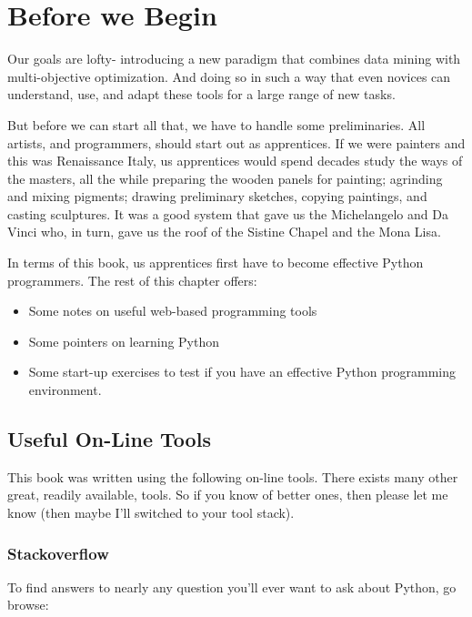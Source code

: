 \section{Before we Begin}\label{before-we-begin}

Our goals are lofty- introducing a new paradigm that combines data
mining with multi-objective optimization. And doing so in such a way
that even novices can understand, use, and adapt these tools for a large
range of new tasks.

But before we can start all that, we have to handle some preliminaries.
All artists, and programmers, should start out as apprentices. If we
were painters and this was Renaissance Italy, us apprentices would spend
decades study the ways of the masters, all the while preparing the
wooden panels for painting; agrinding and mixing pigments; drawing
preliminary sketches, copying paintings, and casting sculptures. It was
a good system that gave us the Michelangelo and Da Vinci who, in turn,
gave us the roof of the Sistine Chapel and the Mona Lisa.

In terms of this book, us apprentices first have to become effective
Python programmers. The rest of this chapter offers:

\begin{itemize}
\itemsep1pt\parskip0pt
\item
  Some notes on useful web-based programming tools
\item
  Some pointers on learning Python
\item
  Some start-up exercises to test if you have an effective Python
  programming environment.
\end{itemize}

\subsection{Useful On-Line Tools}\label{useful-on-line-tools}

This book was written using the following on-line tools. There exists
many other great, readily available, tools. So if you know of better
ones, then please let me know (then maybe I'll switched to your tool
stack).

\subsubsection{Stackoverflow}\label{stackoverflow}

To find answers to nearly any question you'll ever want to ask about
Python, go browse:


